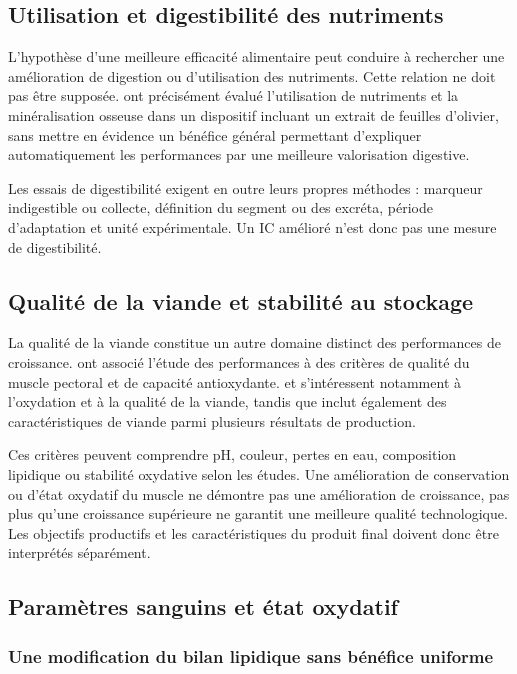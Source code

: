 \subsection{Utilisation et digestibilité des nutriments}

L'hypothèse d'une meilleure efficacité alimentaire peut conduire à rechercher une amélioration de digestion ou d'utilisation des nutriments. Cette relation ne doit pas être supposée. \citet{Leskovec2018} ont précisément évalué l'utilisation de nutriments et la minéralisation osseuse dans un dispositif incluant un extrait de feuilles d'olivier, sans mettre en évidence un bénéfice général permettant d'expliquer automatiquement les performances par une meilleure valorisation digestive.

Les essais de digestibilité exigent en outre leurs propres méthodes : marqueur indigestible ou collecte, définition du segment ou des excréta, période d'adaptation et unité expérimentale. Un IC amélioré n'est donc pas une mesure de digestibilité.

\subsection{Qualité de la viande et stabilité au stockage}

La qualité de la viande constitue un autre domaine distinct des performances de croissance. \citet{Xie2022} ont associé l'étude des performances à des critères de qualité du muscle pectoral et de capacité antioxydante. \citet{Sarica2018} et \citet{Rezar2025} s'intéressent notamment à l'oxydation et à la qualité de la viande, tandis que \citet{Vasilopoulou2026} inclut également des caractéristiques de viande parmi plusieurs résultats de production.

Ces critères peuvent comprendre pH, couleur, pertes en eau, composition lipidique ou stabilité oxydative selon les études. Une amélioration de conservation ou d'état oxydatif du muscle ne démontre pas une amélioration de croissance, pas plus qu'une croissance supérieure ne garantit une meilleure qualité technologique. Les objectifs productifs et les caractéristiques du produit final doivent donc être interprétés séparément.

\subsection{Paramètres sanguins et état oxydatif}

\subsubsection{Une modification du bilan lipidique sans bénéfice uniforme}

